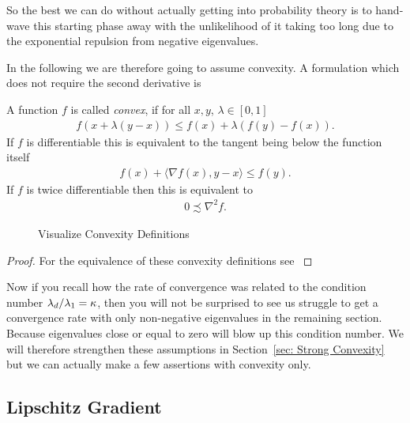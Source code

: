 So the best we can do without actually getting into probability theory is to
hand-wave this starting phase away with the unlikelihood of it taking too long
due to the exponential repulsion from negative eigenvalues.

In the following we are therefore going to assume convexity. A formulation which
does not require the second derivative is
%
\begin{definition}[Convexity]\label{def: convexity}
	A function \(f\) is called \emph{convex}, if for all \(x,y\), \(\lambda\in[0,1]\)
	\begin{align*}
		f(x + \lambda(y-x)) \le f(x) + \lambda (f(y)-f(x)).
	\end{align*}
	If \(f\) is differentiable this is equivalent to the tangent being below
	the function itself
	\begin{align*}
		f(x) + \langle\nabla f(x), y-x\rangle \le f(y).
	\end{align*}
	If \(f\) is twice differentiable then this is equivalent to
	\begin{align*}
		0\precsim\nabla^2 f.
	\end{align*}
 \end{definition}
%
\begin{figure}[h]
	\centering
	\def\svgwidth{1\textwidth}
	
	\caption{Visualize Convexity Definitions}
	\label{fig: visualize convexity definition}
\end{figure}
%
\begin{proof}
	For the equivalence of these convexity definitions see \textcite[Theorem
	2.1.2, 2.1.4]{nesterovLecturesConvexOptimization2018}
 \end{proof}
%
\begin{remark}
	Now if you recall how the rate of convergence was related to the condition number
	\(\lambda_d/\lambda_1 =\kappa\), then you will not be surprised to see us 
	struggle to get a convergence rate with only non-negative eigenvalues in 
	the remaining section. Because eigenvalues close or equal to zero will blow up this
	condition number. We will therefore strengthen these assumptions in
	Section~\ref{sec: Strong Convexity} but we can actually make a few assertions
	with convexity only.
\end{remark}

\subsection{Lipschitz Gradient}

